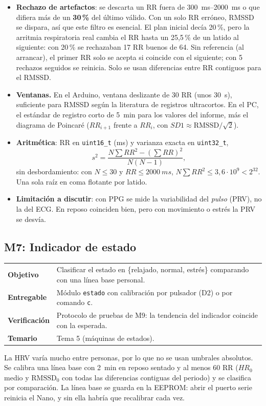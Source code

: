 \documentclass[11pt,a4paper]{article}
\newcommand{\modinfo}[4]{%
  \begin{center}\small
  \renewcommand{\arraystretch}{1.25}
  \begin{tabularx}{\textwidth}{>{\bfseries\color{navy}}lX}
  \toprule
  Objetivo     & #1 \\
  Entregable   & #2 \\
  Verificación & #3 \\
  Temario      & #4 \\
  \bottomrule
  \end{tabularx}
  \end{center}}
\begin{document}
\begin{itemize}[leftmargin=1.2em,itemsep=2pt,topsep=2pt]
  \item \textbf{Rechazo de artefactos}: se descarta un RR fuera de \qtyrange{300}{2000}{ms} o
        que difiera más de un \textbf{30\,\%} del último válido. Con un solo RR erróneo, RMSSD se
        dispara, así que este filtro es esencial. El plan inicial decía 20\,\%, pero la
        arritmia respiratoria real cambia el RR hasta un 25,5\,\% de un latido al siguiente:
        con 20\,\% se rechazaban 17 RR buenos de 64. Sin referencia (al arrancar), el primer RR
        solo se acepta si coincide con el siguiente; con 5 rechazos seguidos se reinicia.
        Solo se usan diferencias entre RR contiguos para el RMSSD.
  \item \textbf{Ventanas.} En el Arduino, ventana deslizante de 30 RR (unos \qty{30}{s}),
        suficiente para RMSSD según la literatura de registros ultracortos. En el PC, el
        estándar de registro corto de \qty{5}{min} para los valores del informe, más el
        diagrama de Poincaré ($RR_{i+1}$ frente a $RR_i$, con $SD1 \approx \mathrm{RMSSD}/\sqrt{2}$).
  \item \textbf{Aritmética}: RR en \texttt{uint16\_t} (ms) y varianza exacta en
        \texttt{uint32\_t},
        \[ s^2 = \frac{N\sum RR^2 - \left(\sum RR\right)^2}{N(N-1)}, \]
        sin desbordamiento: con $N \le 30$ y $RR \le \qty{2000}{ms}$,
        $N\sum RR^2 \le 3{,}6\cdot 10^9 < 2^{32}$. Una sola raíz en coma flotante por latido.
  \item \textbf{Limitación a discutir}: con PPG se mide la variabilidad del \emph{pulso}
        (PRV), no la del ECG. En reposo coinciden bien, pero con movimiento o estrés la PRV
        se desvía.
\end{itemize}

\subsection{M7: Indicador de estado}

\modinfo{Clasificar el estado en \{relajado, normal, estrés\} comparando con una línea base
personal.}
{Módulo \texttt{estado} con calibración por pulsador (D2) o por comando \texttt{c}.}
{Protocolo de pruebas de M9: la tendencia del indicador coincide con la esperada.}
{Tema 5 (máquinas de estados).}

La HRV varía mucho entre personas, por lo que no se usan umbrales absolutos. Se calibra una
línea base con \qty{2}{min} en reposo sentado y al menos 60 RR ($HR_0$ medio y
$\mathrm{RMSSD}_0$ con todas las diferencias contiguas del periodo) y se clasifica por
comparación. La línea base se guarda en la EEPROM: abrir el puerto serie reinicia el Nano, y
sin ella habría que recalibrar cada vez.
\end{document}
